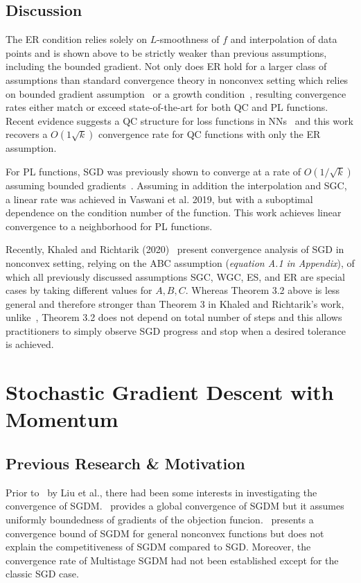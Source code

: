 \documentclass{article}
\begin{document}
\subsection{Discussion}

The ER condition relies solely on $L$-smoothness of $f$ and interpolation of data points and is shown above to be strictly weaker than previous assumptions, including the bounded gradient. Not only does ER hold for a larger class of assumptions than standard convergence theory in nonconvex
setting which relies on bounded gradient assumption~\cite{https://doi.org/10.48550/arxiv.1106.5730, JMLR:v15:hazan14a, Rakhlin2012MakingGD} or a growth condition~\cite{Bertsekas1995NeurodynamicPA, https://doi.org/10.48550/arxiv.1606.04838, Schmidt2017MinimizingFS},
resulting convergence rates either match or exceed state-of-the-art for both QC and PL functions.
Recent evidence suggests a QC structure for loss functions in NNs~\cite{Zhou2019SGDCT} and this work recovers a $O(1\sqrt{k})$ convergence rate for QC functions with only the ER assumption.

For PL functions, SGD was previously shown to converge at a rate of $O(1/\sqrt{k})$ assuming bounded gradients~\cite{Karimi2016LinearCO}. Assuming in addition the interpolation and SGC, a linear rate was achieved in Vaswani et al. 2019, but with a suboptimal dependence on the condition number
of the function. This work achieves linear convergence to a neighborhood for PL functions.

Recently, Khaled and Richtarik (2020)~\cite{https://doi.org/10.48550/arxiv.2002.03329} present convergence analysis of SGD in nonconvex setting, relying on the ABC assumption (\textit{equation A.1 in Appendix}),
of which all previously discussed assumptions SGC, WGC, ES, and ER are special cases by taking different values for $A,B,C$. Whereas
Theorem 3.2 above is less general and therefore stronger than Theorem 3 in Khaled and Richtarik's work, unlike~\cite{https://doi.org/10.48550/arxiv.2002.03329}, Theorem 3.2 does not depend on total number of steps and this allows practitioners to simply
observe SGD progress and stop when a desired tolerance is achieved.

\section{Stochastic Gradient Descent with Momentum}
\label{section4}
\subsection{Previous Research \& Motivation}
\setcounter{equation}{0}
Prior to~\cite{NEURIPS2020_d3f5d4de} by Liu et al., there had been some interests in investigating the convergence of SGDM.~\cite{https://doi.org/10.48550/arxiv.1905.03817} provides a global convergence of SGDM but it assumes uniformly boundedness of gradients of the objection funcion.~\cite{https://doi.org/10.48550/arxiv.1808.10396} presents a convergence bound of SGDM for general nonconvex functions but does not explain the competitiveness of SGDM compared to SGD.
Moreover, the convergence rate of Multistage SGDM had not been established except for the classic SGD case.
\end{document}

